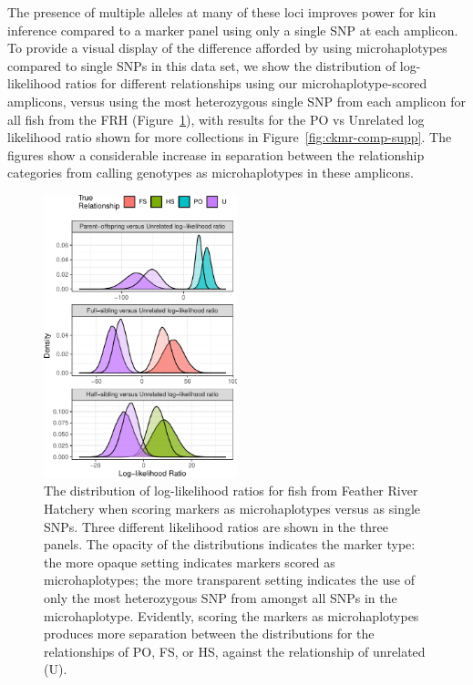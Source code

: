 The presence of multiple alleles at many of these loci improves power for
kin inference compared to a marker panel using only a single SNP at each
amplicon.  To provide a visual display of the difference afforded by using
microhaplotypes compared to single SNPs in this data set, we show the
distribution of log-likelihood ratios for different relationships using our microhaplotype-scored
amplicons, versus using the most heterozygous single SNP from each
amplicon for all fish from the FRH (Figure~\ref{fig:ckmr-comp}), with results for the PO vs Unrelated
log likelihood ratio shown for more collections in Figure~\ref{fig:ckmr-comp-supp}.  The figures show a considerable increase
in separation between the relationship categories from calling genotypes
as microhaplotypes in these amplicons.
\begin{figure}
\newcommand{\fprcap}{\footnotesize The distribution of log-likelihood ratios for
fish from Feather River Hatchery when scoring markers as microhaplotypes versus as
single SNPs.  Three different likelihood ratios are shown in the three panels.  The opacity
of the distributions indicates the marker type: the more opaque setting indicates markers
scored as microhaplotypes; the more transparent setting indicates the use of only the most
heterozygous SNP from amongst all SNPs in the microhaplotype.  Evidently, scoring the markers
as microhaplotypes produces more separation between the distributions for the relationships of PO, FS, or HS, against
the relationship of unrelated (U).}
\begin{center}
\includegraphics[width=0.5\textwidth]{images/frh-comp-figure-crop.pdf}
\end{center}
\caption[\fprcap]{\fprcap}
\label{fig:ckmr-comp}
\end{figure}


